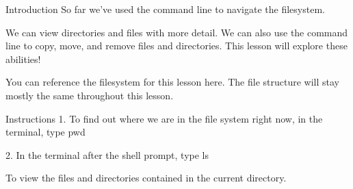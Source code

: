 Introduction
    So far we’ve used the command line to navigate the filesystem.

    We can view directories and files with more detail. We can also use the command line to copy, move, and remove files and directories. This lesson will explore these abilities!

    You can reference the filesystem for this lesson here. The file structure will stay mostly the same throughout this lesson.

Instructions
    1.
    To find out where we are in the file system right now, in the terminal, type    
        pwd
    
    2.
    In the terminal after the shell prompt, type
        ls 
    
    To view the files and directories contained in the current directory.